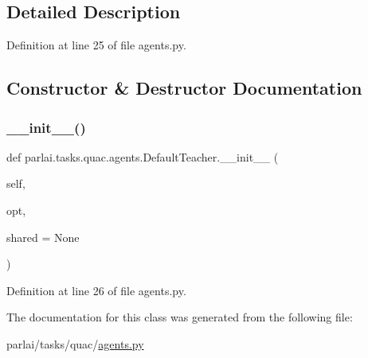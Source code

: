 \subsection{Detailed Description}


Definition at line 25 of file agents.\+py.



\subsection{Constructor \& Destructor Documentation}
\mbox{\label{classparlai_1_1tasks_1_1quac_1_1agents_1_1DefaultTeacher_a45c9f1c71c4c5c93e7fe32685a8fd4e9}} 
\subsubsection{\texorpdfstring{\+\_\+\+\_\+init\+\_\+\+\_\+()}{\_\_init\_\_()}}
{\footnotesize\ttfamily def parlai.\+tasks.\+quac.\+agents.\+Default\+Teacher.\+\_\+\+\_\+init\+\_\+\+\_\+ (\begin{DoxyParamCaption}\item[{}]{self,  }\item[{}]{opt,  }\item[{}]{shared = {\ttfamily None} }\end{DoxyParamCaption})}



Definition at line 26 of file agents.\+py.



The documentation for this class was generated from the following file\+:\begin{DoxyCompactItemize}
\item 
parlai/tasks/quac/\hyperlink{parlai_2tasks_2quac_2agents_8py}{agents.\+py}\end{DoxyCompactItemize}
